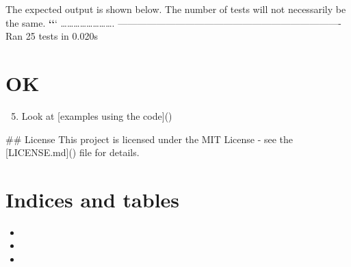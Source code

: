 \documentclass[letterpaper,10pt,english]{sphinxmanual}
\begin{document}
The expected output is shown below. The number of tests will not necessarily be the same.
{\color{red}\bfseries{}{}`{}`}{}`
…………………….
———————————————————————-
Ran 25 tests in 0.020s


\chapter{OK}
\label{\detokenize{includeme::doc}}\label{\detokenize{includeme:welcome-to-pymutt-s-documentation}}\label{\detokenize{includeme:ok}}\begin{enumerate}
\setcounter{enumi}{4}
\item {} 
Look at {[}examples using the code{]}()

\end{enumerate}

\#\# License
This project is licensed under the MIT License - see the {[}LICENSE.md{]}() file for details.


\chapter{Indices and tables}
\label{\detokenize{index:indices-and-tables}}\begin{itemize}
\item {} 

\item {} 

\item {} 

\end{itemize}



\renewcommand{\indexname}{Index}
\printindex
\end{document}
